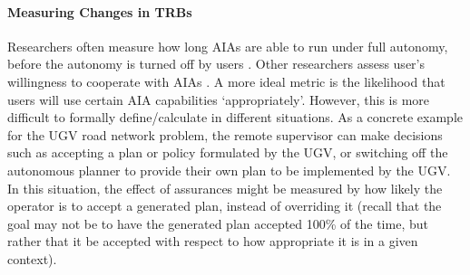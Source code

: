     \paragraph{Measuring Changes in TRBs} Researchers often measure how long AIAs are able to run under full autonomy, before the autonomy is turned off by users \cite{Freedy2007-sg,Desai2012-rc}. 
    Other researchers assess user's willingness to cooperate with AIAs \cite{Salem2015-md,Wu2016-ei,Bainbridge2011-pl}. 
    A more ideal metric is the likelihood that users will use certain AIA capabilities `appropriately'. 
    However, this is more difficult to formally define/calculate in different situations. 
    As a concrete example for the UGV road network problem, %
    the remote supervisor can make decisions such as accepting a plan or policy formulated by the UGV, or switching off the autonomous planner to provide their own plan to be implemented by the UGV. 
    In this situation, the effect of assurances might be measured by how likely the operator is to accept a generated plan, instead of overriding it (recall that the goal may not be to have the generated plan accepted 100\% of the time, but rather that it be accepted with respect to how appropriate it is in a given context).

